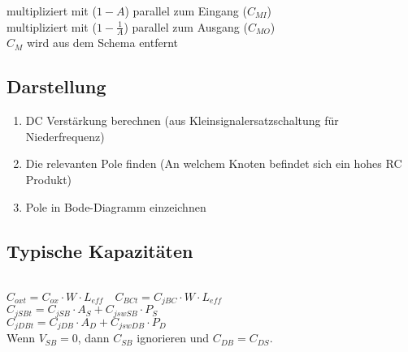 \begin{multicols}{2}
multipliziert mit ($1-A$) parallel zum Eingang ($C_{MI}$)\\
multipliziert mit ($1-\frac{1}{A}$) parallel zum Ausgang ($C_{MO}$)\\

$C_M$ wird aus dem Schema entfernt\\

\subsection{Darstellung}
\begin{enumerate}
  \item DC Verstärkung berechnen (aus Kleinsignalersatzschaltung für
  Niederfrequenz)
  \item Die relevanten Pole finden (An welchem Knoten befindet sich ein hohes
  RC Produkt)
  \item Pole in Bode-Diagramm einzeichnen
\end{enumerate}

\subsection{Typische Kapazitäten}
 \\

$C_{oxt} = C_{ox} \cdot W \cdot L_{eff}  \quad C_{BCt} = C_{jBC} \cdot W \cdot L_{eff} $ \\
$C_{jSBt} = C_{jSB} \cdot A_S + C_{jswSB} \cdot P_S$ \\
$C_{jDBt} = C_{jDB} \cdot A_D + C_{jswDB} \cdot P_D$ \\

Wenn $V_{SB}=0$, dann $C_{SB}$ ignorieren und $C_{DB}=C_{DS}$.

\end{multicols}